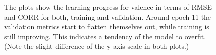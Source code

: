 \begin{figure}[htbp]
  \centering
  \hfill
  \caption[Training curves of the proposed approach]{The plots show the learning progress for valence in terms of RMSE and CORR for both, training and validation. Around epoch 11 the validation metrics start to flatten themselves out, while training is still improving. This indicates a tendency of the model to overfit. (Note the slight difference of the y-axis scale in both plots.)}
  \label{fig:LearningCurveResults}
\end{figure}

